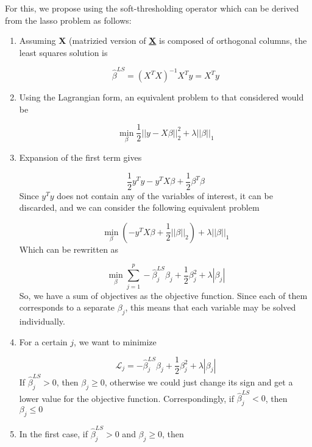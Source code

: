 For this, we propose using the soft-thresholding operator which can be derived from the lasso problem as follows:
\vspace{15pt}
\begin{enumerate}
    \item Assuming \textbf{X} (matrizied version of \textbf{\underline{X}} is composed of orthogonal columns, the least squares solution is
    
    \begin{equation}
        \hat{\beta}^{LS}=(X^TX)^{-1}X^Ty=X^Ty
    \end{equation}
    \item Using the Lagrangian form, an equivalent problem to that considered would be
    
    \begin{equation}
        \min_\beta\frac{1}{2}||y-X\beta||^2_2+\lambda||\beta||_1
    \end{equation}
    \item Expansion of the first term gives
    
    \begin{equation}
        \frac{1}{2}y^Ty-y^TX\beta+\frac{1}{2}\beta^T\beta
    \end{equation}
    Since $y^Ty$ does not contain any of the variables of interest, it can be discarded, and we can consider the following equivalent problem
    
    \begin{equation}
        \min_\beta(-y^TX\beta+\frac{1}{2}||\beta||_2)+\lambda||\beta||_1
    \end{equation}
    Which can be rewritten as
    
    \begin{equation}
        \min_\beta \sum_{j=1}^{p}-\hat{\beta}^{LS}_j\beta_j+\frac{1}{2}\beta^2_j+\lambda|\beta_j|
    \end{equation}
    So, we have a sum of objectives as the objective function. Since each of them corresponds to a separate $\beta_j$, this means that each variable may be solved individually.
    \item For a certain $j$, we want to minimize
    
    \begin{equation}
        \mathcal{L}_j = -\hat{\beta}^{LS}_j\beta_j+\frac{1}{2}\beta^2_j+\lambda|\beta_j|
    \end{equation}
    If $\hat{\beta}^{LS}_j > 0$, then $\beta_j \geq 0$, otherwise we could just change its sign and get a lower value for the objective function. Correspondingly, if $\hat{\beta}^{LS}_j < 0$, then $\beta_j \leq 0$
    \item In the first case, if $\hat{\beta}^{LS}_j > 0$ and $\beta_j \geq 0$, then
    

\end{enumerate}
